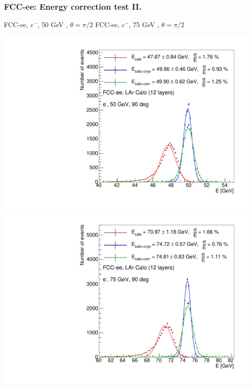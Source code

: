 \documentclass{beamer}
\newcommand{\redtext}[1]{%
  \textcolor{myRed}{#1}
}
\begin{document}
\begin{frame}
  \frametitle{FCC-ee: Energy correction test II.}

  \centering
  FCC-ee, $e^{-}$, \redtext{50 GeV}, $\theta = \pi/2$ \hspace{8mm}
  FCC-ee, $e^{-}$, \redtext{75 GeV}, $\theta = \pi/2$ \\[1.5ex]
  \begin{adjustwidth}{-9mm}{-9mm}
    \includegraphics[width=0.49\linewidth]{figures/12layers/hist_energy_corr_validation_90deg_50GeV.pdf}
    \includegraphics[width=0.49\linewidth]{figures/12layers/hist_energy_corr_validation_90deg_75GeV.pdf}
  \end{adjustwidth}
\end{frame}
\end{document}

